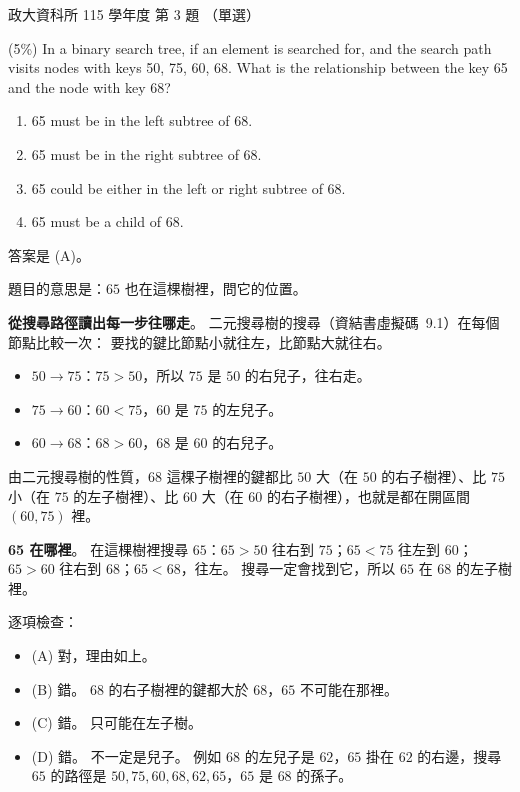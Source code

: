 \begin{pastexam}[label={px:nccu-115-dsa-03}]{政大資科所 115 學年度 第 3 題}
（單選）

(5\%) In a binary search tree, if an element is searched for, and the search path visits nodes with
keys 50, 75, 60, 68. What is the relationship between the key 65 and the node with key 68?
\begin{enumerate}[label=(\Alph*)]
\item 65 must be in the left subtree of 68.
\item 65 must be in the right subtree of 68.
\item 65 could be either in the left or right subtree of 68.
\item 65 must be a child of 68.
\end{enumerate}
\end{pastexam}

\begin{pastsoln}
答案是 (A)。

題目的意思是：$65$ 也在這棵樹裡，問它的位置。

\textbf{從搜尋路徑讀出每一步往哪走}。 二元搜尋樹的搜尋（資結書虛擬碼~9.1）在每個節點比較一次：
要找的鍵比節點小就往左，比節點大就往右。
\begin{itemize}
\item $50 \to 75$：$75 > 50$，所以 $75$ 是 $50$ 的右兒子，往右走。
\item $75 \to 60$：$60 < 75$，$60$ 是 $75$ 的左兒子。
\item $60 \to 68$：$68 > 60$，$68$ 是 $60$ 的右兒子。
\end{itemize}
由二元搜尋樹的性質，$68$ 這棵子樹裡的鍵都比 $50$ 大（在 $50$ 的右子樹裡）、比 $75$ 小（在 $75$
的左子樹裡）、比 $60$ 大（在 $60$ 的右子樹裡），也就是都在開區間 $(60, 75)$ 裡。

\textbf{65 在哪裡}。 在這棵樹裡搜尋 $65$：$65 > 50$ 往右到 $75$；$65 < 75$ 往左到 $60$；
$65 > 60$ 往右到 $68$；$65 < 68$，往左。 搜尋一定會找到它，所以 $65$ 在 $68$ 的左子樹裡。

逐項檢查：
\begin{itemize}
\item (A) 對，理由如上。
\item (B) 錯。 $68$ 的右子樹裡的鍵都大於 $68$，$65$ 不可能在那裡。
\item (C) 錯。 只可能在左子樹。
\item (D) 錯。 不一定是兒子。 例如 $68$ 的左兒子是 $62$，$65$ 掛在 $62$ 的右邊，搜尋 $65$ 的路徑是
$50, 75, 60, 68, 62, 65$，$65$ 是 $68$ 的孫子。
\end{itemize}
\end{pastsoln}
